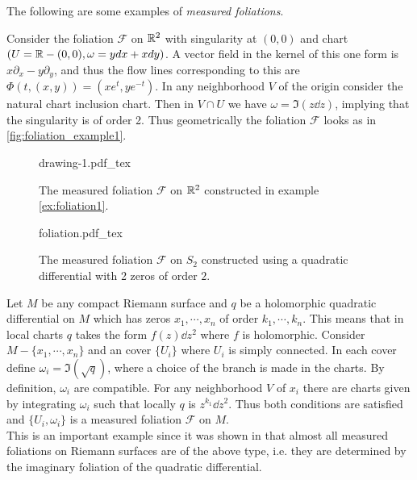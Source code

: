 The following are some examples of \textit{measured foliations}.
\begin{exmp}\label{ex:foliation1}
  Consider the foliation $ \mathscr{F}$ on $\R^2$ with singularity at $(0,0)$ and chart $(U= \mathbb{R}- (0,0), \omega = ydx+xdy)$. A vector field in the kernel of this one form is $x\partial_{x} - y\partial_y$, and thus the flow lines corresponding to this are $\Phi(t,(x,y)) = (xe^t, ye^{-t})$. In any neighborhood $V$ of the origin consider the natural chart inclusion chart. Then in $V\cap U$ we have $\omega = \Im(z\dd z)$, implying that the singularity is of order 2. Thus geometrically the foliation $ \mathscr{F}$ looks as in \ref{fig:foliation_example1}.  
\end{exmp}
\begin{figure}[h]
  \centering
  \begin{minipage}[c]{0.4\textwidth}
    \def\svgwidth{\textwidth}
    {drawing-1.pdf_tex}
    \caption[Foliation on $\R^2$]{The measured foliation $ \mathscr{F}$ on $\R^2$ constructed in example \ref{ex:foliation1}.}
    \label{fig:foliation_example1}
  \end{minipage}
  \hfill
  \begin{minipage}[c]{0.4\textwidth}
    \def\svgwidth{\textwidth}
    {foliation.pdf_tex}
    \caption[Foliation on $S_2$]{The measured foliation $ \mathscr{F}$ on $S_2$ constructed using a quadratic differential with 2 zeros of order $2$.}
    \label{fig:foliation_example2}
  \end{minipage}
\end{figure}
\begin{figure}[h]
  \centering
\end{figure}
\begin{exmp}\label{ex:foliation2}
  Let $M$ be any compact Riemann surface and $q$ be a holomorphic quadratic differential on $M$ which has zeros $x_1,\cdots, x_n$ of order $k_1,\cdots, k_n$. This means that in local charts $q$ takes the form $f(z)\dd z^2$ where $f$ is holomorphic. Consider $M - \{x_1,\cdots, x_n\}$ and an cover $\{U_i\}$ where $U_i$ is simply connected. In each cover define $\omega_i = \Im(\sqrt{q})$, where a choice of the branch is made in the charts. By definition, $\omega_i$ are compatible. For any neighborhood $V$ of $x_i$ there are charts given by integrating $\omega_i$ such that locally $q$ is $z^{k_1}\dd z^2$. Thus both conditions are satisfied and $\{U_i, \omega_i\}$ is a measured foliation $ \mathscr{F}$ on $M$.\\

  This is an important example since it was shown in \cite{hubbard} that almost all measured foliations on Riemann surfaces are of the above type, i.e. they are determined by the imaginary foliation of the quadratic differential.
\end{exmp}

